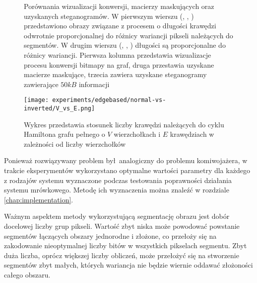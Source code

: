 {{{\begin{figure}
                \caption[Porównania wizualizacji konwersji oraz macierzy maskujących.]
                {Porównania wizualizacji konwersji, macierzy maskujących oraz uzyskanych steganogramów. W pierwszym
                    wierszu (, , )
                    przedstawiono obrazy związane z procesem o długości krawędzi odwrotnie proporcjonalnej do różnicy
                    wariancji pikseli należących do segmentów. W drugim wierszu (,
                    , ) długości są proporcjonalne do
                    różnicy wariancji. Pierwsza kolumna przedstawia wizualizacje procesu konwersji bitmapy na graf,
                    druga przestawia uzyskane macierze maskujące, trzecia zawiera uzyskane steganogramy zawierające
                    $50kB$ informacji}
                \label{fig:exp-edge}
            \end{figure}

            \begin{figure}
                \center
                \texttt{[image: experiments/edgebased/normal-vs-inverted/V\_vs\_E.png]}
                \caption
                {Wykres przedstawia stosunek liczby krawędzi należących do cyklu Hamiltona grafu pełnego o $V$
                    wierzchołkach i $E$ krawędziach w zależności od liczby wierzchołków}
                \label{fig:exp-edge-v-vs-e}
            \end{figure}

            Ponieważ rozwiązywany problem był analogiczny do problemu komiwojażera, w trakcie eksperymentów wykorzystano
            optymalne wartości parametry dla każdego z rodzajów systemu wyznaczone podczas testowania poprawności
            działania systemu mrówkowego. Metodę ich wyznaczenia można znaleźć w rozdziale \ref{chap:implementation}.

            Ważnym aspektem metody wykorzystującą segmentację obrazu jest dobór docelowej liczby grup pikseli. Wartość
            zbyt niska może powodować powstanie segmentów łączących obszary jednorodne i złożone, co przełoży się na
            zakodowanie nieoptymalnej liczby bitów w wszystkich pikselach segmentu. Zbyt duża liczba, oprócz większej
            liczby obliczeń, może przełożyć się na stworzenie segmentów zbyt małych, których wariancja nie
            będzie wiernie oddawać złożoności całego obszaru.

}}}

